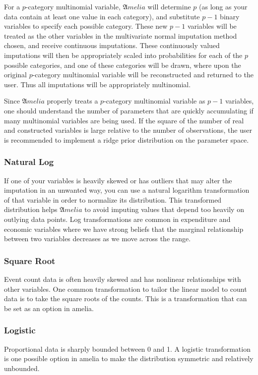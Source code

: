 \documentclass[12pt,titlepage]{article}
\begin{document}
For a $ p$-category multinomial variable, ${\mathfrak Amelia}$ will
determine $ p$ (as long as your data contain at least one value in each
category), and substitute $ p-1$ binary variables to specify each
possible category. These new $ p-1$ variables will be treated as the
other variables in the multivariate normal imputation method chosen,
and receive continuous imputations. These continuously valued
imputations will then be appropriately scaled into probabilities for
each of the $ p$ possible categories, and one of these categories will
be drawn, where upon the original $ p$-category multinomial variable
will be reconstructed and returned to the user. Thus all imputations
will be appropriately multinomial.

Since ${\mathfrak Amelia}$ properly treats a $ p$-category multinomial
variable as $ p-1$ variables, one should understand the number of
parameters that are quickly accumulating if many multinomial variables
are being used. If the square of the number of real and constructed
variables is large relative to the number of observations, the user is
recommended to implement a ridge prior distribution on the parameter
space.

\subsubsection{Natural Log}
\label{sec:log}
If one of your variables is heavily skewed or has outliers that may
alter the imputation in an unwanted way, you can use a natural
logarithm transformation of that variable in order to normalize its
distribution.  This transformed distribution helps ${\mathfrak Amelia}$
to avoid imputing values that depend too heavily on outlying data
points.  Log transformations are common in expenditure and economic
variables where we have strong beliefs that the marginal relationship
between two variables decreases as we move across the range.

\subsubsection{Square Root}
\label{sec:sqrt}
Event count data is often heavily skewed and has nonlinear
relationships with other variables.  One common transformation to
tailor the linear model to count data is to take the square roots of
the counts.  This is a transformation that can be set as an option in
amelia.
 
\subsubsection{Logistic}
\label{sec:lgstc}
Proportional data is sharply bounded between 0 and 1.  A logistic
transformation is one possible option in amelia to make the
distribution symmetric and relatively unbounded.
\end{document}
